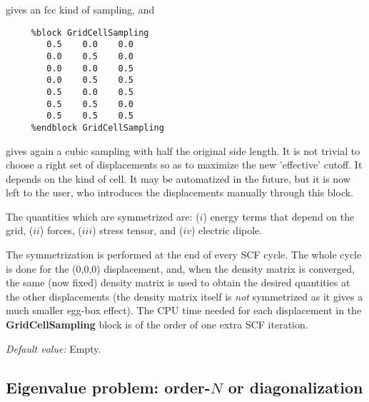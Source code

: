 \begin{description}
gives an fcc kind of sampling, and


\begin{verbatim}
     %block GridCellSampling
        0.5    0.0    0.0
        0.0    0.5    0.0
        0.0    0.0    0.5
        0.0    0.5    0.5
        0.5    0.0    0.5
        0.5    0.5    0.0
        0.5    0.5    0.5
     %endblock GridCellSampling
\end{verbatim}

gives again a cubic sampling with half the original side length.
It is not trivial to choose a right set of displacements so as
to maximize the new 'effective' cutoff. It depends on the 
kind of cell. It may be automatized in the future, but it 
is now left to the user, who introduces the displacements
manually through this block.

The quantities which are symmetrized are: ($i$) energy terms
that depend on the grid, ($ii$) forces, ($iii$) stress
tensor, and ($iv$) electric dipole.

The symmetrization is performed at the end of every SCF cycle. The 
whole cycle is done for the (0,0,0) displacement, and, when the
density matrix is converged, the same (now fixed)
density matrix is used to obtain the desired quantities at the 
other displacements (the density matrix itself is {\it not}
symmetrized as it gives a much smaller egg-box effect).
The CPU time needed for each displacement
in the {\bf GridCellSampling} block
is of the order of one extra SCF iteration.

{\it Default value:} Empty.

\end{description}



\vspace{5pt}
\subsection{Eigenvalue problem: order-$N$ or diagonalization}

